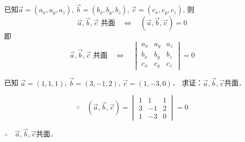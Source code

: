 已知$\vec{a}=(a_x,a_y,a_z)$, $\vec{b}=(b_x,b_y,b_z)$, $\vec{c}=(c_x,c_y,c_z)$, 则
\[\vec{a}, \vec{b}, \vec{c}\text{ 共面} \quad \Longleftrightarrow \quad  (\vec{a}, \vec{b}, \vec{c})=0\]
即
\[\vec{a}, \vec{b}, \vec{c}\text{ 共面} \quad \Longleftrightarrow \quad \begin{vmatrix}
    a_x&a_y&a_z\\b_x&b_y&b_z\\c_x&c_y&c_z
\end{vmatrix}=0\]

\begin{example}
    已知 $\vec{a}=(1,1,1)$, $\vec{b}=(3,-1,2)$, 
$\vec{c}=(1,-3,0)$．
求证：$\vec{a},\vec{b},\vec{c}$共面．
\end{example}

\begin{solution}
\[\because\quad (\vec{a},\vec{b},\vec{c})=\begin{vmatrix}
    1&1&1\\3&-1&2\\1&-3&0
\end{vmatrix}=0\]

$\therefore\quad \vec{a},\vec{b},\vec{c}$共面．
\end{solution}


